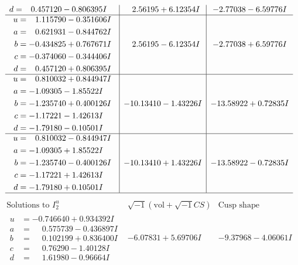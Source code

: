 \documentclass[1p]{elsarticle_modified}
\theoremstyle{definition}
\newcommand{\I}{\sqrt{-1}}
\begin{document}
$$\begin{array}{c|c|c}
\begin{aligned}
d &= \phantom{-}0.457120 - 0.806395 I\end{aligned}
 & \phantom{-}2.56195 + 6.12354 I & -2.77038 - 6.59776 I \\ \hline\begin{aligned}
u &= \phantom{-}1.115790 - 0.351606 I \\
a &= \phantom{-}0.621931 - 0.844762 I \\
b &= -0.434825 + 0.767671 I \\
c &= -0.374060 - 0.344406 I \\
d &= \phantom{-}0.457120 + 0.806395 I\end{aligned}
 & \phantom{-}2.56195 - 6.12354 I & -2.77038 + 6.59776 I \\ \hline\begin{aligned}
u &= \phantom{-}0.810032 + 0.844947 I \\
a &= -1.09305 - 1.85522 I \\
b &= -1.235740 + 0.400126 I \\
c &= -1.17221 - 1.42613 I \\
d &= -1.79180 - 0.10501 I\end{aligned}
 & -10.13410 - 1.43226 I & -13.58922 + 0.72835 I \\ \hline\begin{aligned}
u &= \phantom{-}0.810032 - 0.844947 I \\
a &= -1.09305 + 1.85522 I \\
b &= -1.235740 - 0.400126 I \\
c &= -1.17221 + 1.42613 I \\
d &= -1.79180 + 0.10501 I\end{aligned}
 & -10.13410 + 1.43226 I & -13.58922 - 0.72835 I\\
 \hline 
 \end{array}$$\newpage$$\begin{array}{c|c|c}  
\text{Solutions to }I^u_{2}& \I (\text{vol} + \sqrt{-1}CS) & \text{Cusp shape}\\
 \hline 
\begin{aligned}
u &= -0.746640 + 0.934392 I \\
a &= \phantom{-}0.575739 - 0.436897 I \\
b &= \phantom{-}0.102199 + 0.836400 I \\
c &= \phantom{-}0.76290 - 1.40128 I \\
d &= \phantom{-}1.61980 - 0.96664 I\end{aligned}
 & -6.07831 + 5.69706 I & -9.37968 - 4.06061 I \\ \hline\begin{aligned}

\end{aligned}
\end{array}$$
\end{document}
